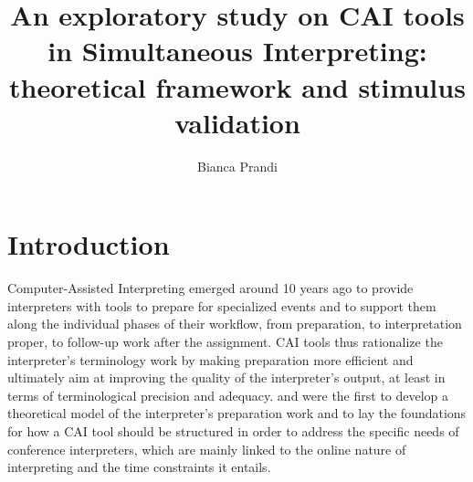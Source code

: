 \documentclass[output=paper]{langsci/langscibook}
\author{Bianca Prandi\affiliation{Affiliation}}
\title{An exploratory study on CAI tools in Simultaneous Interpreting: theoretical framework and stimulus validation}
\begin{document}

 

 

 

 

 

 

 

\section{Introduction}\label{sec:prandi:1}
Computer-Assisted Interpreting emerged around 10 years ago to provide interpreters with tools to prepare for specialized events and to support them along the individual phases of their workflow, from preparation, to interpretation proper, to follow-up work after the assignment. \textsc{CAI} tools thus rationalize the interpreter’s terminology work by making preparation more efficient and ultimately aim at improving the quality of the interpreter’s output, at least in terms of terminological precision and adequacy. \citet{Rütten2007} and \citet{Will2009} were the first to develop a theoretical model of the interpreter’s preparation work and to lay the foundations for how a \textsc{CAI} tool should be structured in order to address the specific needs of conference interpreters, which are mainly linked to the online nature of interpreting and the time constraints it entails.
\end{document}
